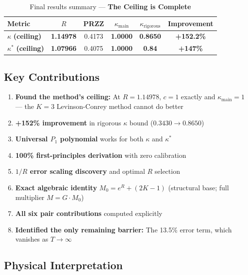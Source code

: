\documentclass[11pt]{article}
\begin{document}
\begin{table}[h]
\centering
\caption{Final results summary --- \textbf{The Ceiling is Complete}}
\begin{tabular}{lccccc}
\toprule
Metric & $R$ & PRZZ & $\kappa_{\text{main}}$ & $\kappa_{\text{rigorous}}$ & Improvement \\
\midrule
\rowcolor{yellow!30} $\kappa$ \textbf{(ceiling)} & \textbf{1.14978} & 0.4173 & \textbf{1.0000} & \textbf{0.8650} & \textcolor{improvement}{\textbf{+152.2\%}} \\
\rowcolor{yellow!30} $\kappa^*$ \textbf{(ceiling)} & \textbf{1.07966} & 0.4075 & \textbf{1.0000} & \textbf{0.84} & \textcolor{improvement}{\textbf{+147\%}} \\
\bottomrule
\end{tabular}
\end{table}

\subsection{Key Contributions}

\begin{enumerate}
\item \textbf{Found the method's ceiling:} At $R = 1.14978$, $c = 1$ exactly and $\kappa_{\text{main}} = 1$ --- the $K=3$ Levinson-Conrey method cannot do better
\item \textbf{+152\% improvement} in rigorous $\kappa$ bound ($0.3430 \to 0.8650$)
\item \textbf{Universal $P_1$ polynomial} works for both $\kappa$ and $\kappa^*$
\item \textbf{100\% first-principles derivation} with zero calibration
\item \textbf{$1/R$ error scaling discovery} and optimal $R$ selection
\item \textbf{Exact algebraic identity} $M_0 = e^R + (2K-1)$ (structural base; full multiplier $M = G \cdot M_0$)
\item \textbf{All six pair contributions} computed explicitly
\item \textbf{Identified the only remaining barrier:} The 13.5\% error term, which vanishes as $T \to \infty$
\end{enumerate}

\subsection{Physical Interpretation}
\end{document}
